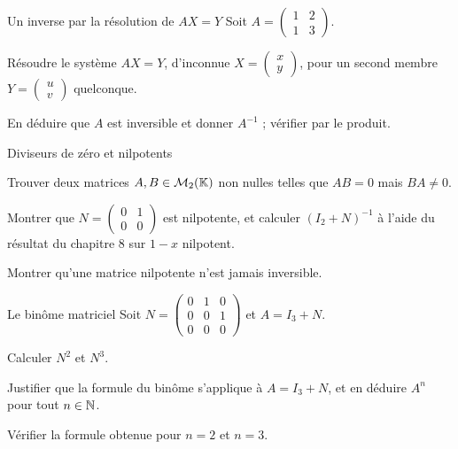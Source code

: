 \begin{exercice}[1]{Un inverse par la résolution de $AX=Y$}
Soit $A=\begin{pmatrix}1&2\\1&3\end{pmatrix}$.
\begin{questions}
  \item Résoudre le système $AX=Y$, d'inconnue
    $X=\begin{pmatrix}x\\y\end{pmatrix}$, pour un second membre
    $Y=\begin{pmatrix}u\\v\end{pmatrix}$ quelconque.
  \item En déduire que $A$ est inversible et donner $A^{-1}$ ; vérifier
    par le produit.
\end{questions}
\end{exercice}


\begin{exercice}[2]{Diviseurs de zéro et nilpotents}
\begin{questions}
  \item Trouver deux matrices $A,B\in\mathcal{M}_2(\mathbb{K})$ non nulles telles
    que $AB=0$ mais $BA\neq0$.
  \item Montrer que $N=\begin{pmatrix}0&1\\0&0\end{pmatrix}$ est
    nilpotente, et calculer $(I_2+N)^{-1}$ à l'aide du résultat du
    chapitre 8 sur $1-x$ nilpotent.
  \item Montrer qu'une matrice nilpotente n'est jamais inversible.
\end{questions}
\end{exercice}

\begin{exercice}[2]{Le binôme matriciel}
Soit $N=\begin{pmatrix}0&1&0\\0&0&1\\0&0&0\end{pmatrix}$ et $A=I_3+N$.
\begin{questions}
  \item Calculer $N^{2}$ et $N^{3}$.
  \item Justifier que la formule du binôme s'applique à $A=I_3+N$, et en
    déduire $A^{n}$ pour tout $n\in\mathbb{N}$.
  \item Vérifier la formule obtenue pour $n=2$ et $n=3$.
\end{questions}
\end{exercice}

